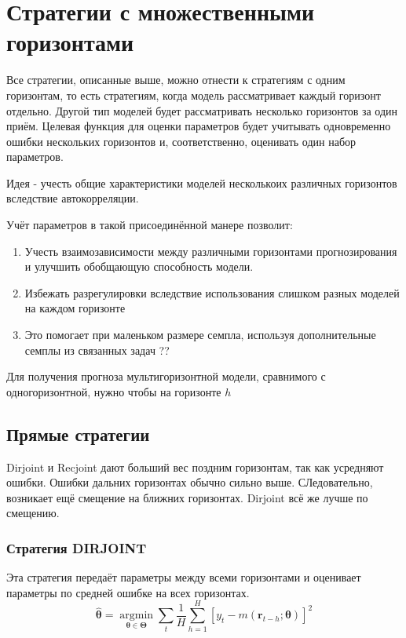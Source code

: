 \documentclass[a4paper,12pt]{article}
\begin{document}
\section{Стратегии с множественными горизонтами}

Все стратегии, описанные выше, можно отнести к стратегиям с одним горизонтам, то есть стратегиям, когда модель рассматривает каждый горизонт отдельно. Другой тип моделей будет рассматривать несколько горизонтов за один приём. Целевая функция для оценки параметров будет учитывать одновременно ошибки нескольких горизонтов и, соответственно, оценивать один набор параметров.

Идея - учесть общие характеристики моделей несколькоих различных горизонтов вследствие автокорреляции. 

Учёт параметров в такой присоединённой манере позволит:

\begin{enumerate}[\Sun]
	\item Учесть взаимозависимости между различными горизонтами прогнозирования и улучшить обобщающую способность модели.
	
	\item Избежать разрегулировки вследствие использования слишком разных моделей на каждом горизонте
	
	\item Это помогает при маленьком размере семпла, используя дополнительные семплы из связанных задач ??
\end{enumerate}

Для получения прогноза мультигоризонтной модели, сравнимого с одногоризонтной, нужно чтобы на горизонте $ h $

\subsection{Прямые стратегии}

Dirjoint и Recjoint  дают больший вес поздним горизонтам, так как усредняют ошибки. Ошибки дальних горизонтах обычно сильно выше. СЛедовательно, возникает ещё смещение на ближних горизонтах. Dirjoint всё же лучше по смещению.
\subsubsection{Стратегия DIRJOINT}

Эта стратегия передаёт параметры между всеми горизонтами и оценивает параметры по средней ошибке на всех горизонтах.
\[
\hat{\boldsymbol{\theta}}=\underset{\boldsymbol{\theta} \in \boldsymbol{\Theta}}{\operatorname{argmin}} \sum_{t} \frac{1}{H} \sum_{h=1}^{H}\left[y_{t}-m\left(\boldsymbol{r}_{t-h} ; \boldsymbol{\theta}\right)\right]^{2}
\]
\end{document}
